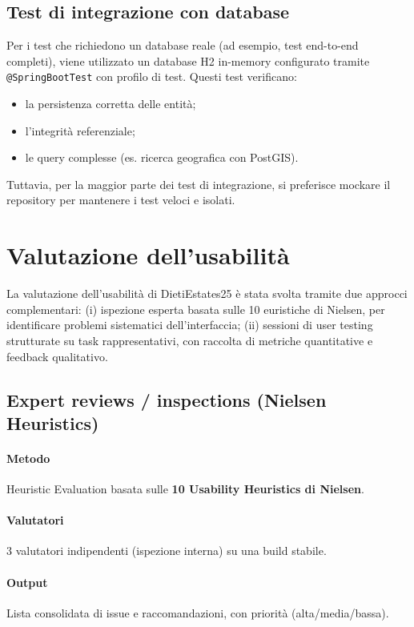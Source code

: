 \documentclass[a4paper,11pt]{report}
\begin{document}
\subsection{Test di integrazione con database}

Per i test che richiedono un database reale (ad esempio, test end-to-end completi), viene utilizzato un database H2 in-memory configurato tramite \texttt{@SpringBootTest} con profilo di test. Questi test verificano:

\begin{itemize}[nosep]
  \item la persistenza corretta delle entità;
  \item l'integrità referenziale;
  \item le query complesse (es. ricerca geografica con PostGIS).
\end{itemize}

Tuttavia, per la maggior parte dei test di integrazione, si preferisce mockare il repository per mantenere i test veloci e isolati.

\pagebreak

\section{Valutazione dell’usabilità}

La valutazione dell’usabilità di DietiEstates25 è stata svolta tramite due approcci complementari:
(i) ispezione esperta basata sulle 10 euristiche di Nielsen, per identificare problemi sistematici dell’interfaccia;
(ii) sessioni di user testing strutturate su task rappresentativi, con raccolta di metriche quantitative e feedback qualitativo.

\subsection{Expert reviews / inspections (Nielsen Heuristics)}

\paragraph{Metodo} Heuristic Evaluation basata sulle \textbf{10 Usability Heuristics di Nielsen}.
\paragraph{Valutatori} 3 valutatori indipendenti (ispezione interna) su una build stabile.
\paragraph{Output} Lista consolidata di issue e raccomandazioni, con priorità (alta/media/bassa).
\end{document}
